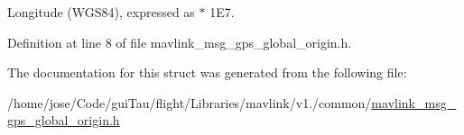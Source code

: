 Longitude (W\-G\-S84), expressed as $\ast$ 1\-E7. 



Definition at line 8 of file mavlink\-\_\-msg\-\_\-gps\-\_\-global\-\_\-origin.\-h.



The documentation for this struct was generated from the following file\-:\begin{DoxyCompactItemize}
\item 
/home/jose/\-Code/gui\-Tau/flight/\-Libraries/mavlink/v1./common/\hyperlink{mavlink__msg__gps__global__origin_8h}{mavlink\-\_\-msg\-\_\-gps\-\_\-global\-\_\-origin.\-h}\end{DoxyCompactItemize}
